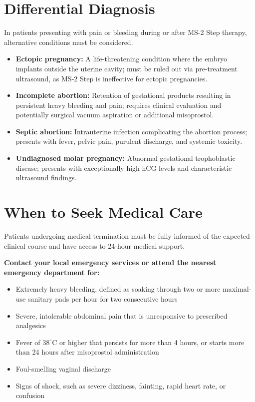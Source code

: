 \section*{Differential Diagnosis}
In patients presenting with pain or bleeding during or after MS-2 Step therapy, alternative conditions must be considered.
\begin{itemize}
    \item \textbf{Ectopic pregnancy:} A life-threatening condition where the embryo implants outside the uterine cavity; must be ruled out via pre-treatment ultrasound, as MS-2 Step is ineffective for ectopic pregnancies.
    \item \textbf{Incomplete abortion:} Retention of gestational products resulting in persistent heavy bleeding and pain; requires clinical evaluation and potentially surgical vacuum aspiration or additional misoprostol.
    \item \textbf{Septic abortion:} Intrauterine infection complicating the abortion process; presents with fever, pelvic pain, purulent discharge, and systemic toxicity.
    \item \textbf{Undiagnosed molar pregnancy:} Abnormal gestational trophoblastic disease; presents with exceptionally high hCG levels and characteristic ultrasound findings.
\end{itemize}

\section*{When to Seek Medical Care}
Patients undergoing medical termination must be fully informed of the expected clinical course and have access to 24-hour medical support.

\textbf{Contact your local emergency services or attend the nearest emergency department for:}
\begin{itemize}
    \item Extremely heavy bleeding, defined as soaking through two or more maximal-use sanitary pads per hour for two consecutive hours
    \item Severe, intolerable abdominal pain that is unresponsive to prescribed analgesics
    \item Fever of $38^\circ$C or higher that persists for more than 4 hours, or starts more than 24 hours after misoprostol administration
    \item Foul-smelling vaginal discharge
    \item Signs of shock, such as severe dizziness, fainting, rapid heart rate, or confusion
\end{itemize}

